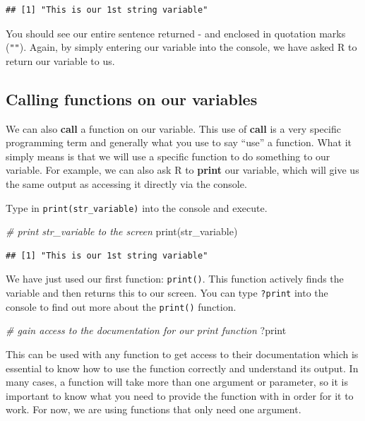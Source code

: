 \documentclass[
]{book}
\newenvironment{Shaded}{\begin{snugshade}}{\end{snugshade}}
\newcommand{\CommentTok}[1]{\textcolor[rgb]{0.56,0.35,0.01}{\textit{#1}}}
\newcommand{\FunctionTok}[1]{\textcolor[rgb]{0.00,0.00,0.00}{#1}}
\newcommand{\NormalTok}[1]{#1}
\begin{document}
\begin{verbatim}
## [1] "This is our 1st string variable"
\end{verbatim}

You should see our entire sentence returned - and enclosed in quotation marks (\texttt{""}). Again, by simply entering our variable into the console, we have asked R to return our variable to us.

\hypertarget{calling-functions-on-our-variables}{%
\subsection{Calling functions on our variables}\label{calling-functions-on-our-variables}}

We can also \textbf{call} a function on our variable. This use of \textbf{call} is a very specific programming term and generally what you use to say ``use'' a function. What it simply means is that we will use a specific function to do something to our variable. For example, we can also ask R to \textbf{print} our variable, which will give us the same output as accessing it directly via the console.

Type in \texttt{print(str\_variable)} into the console and execute.

\begin{Shaded}
\begin{Highlighting}[]
\CommentTok{\# print str\_variable to the screen}
\FunctionTok{print}\NormalTok{(str\_variable)}
\end{Highlighting}
\end{Shaded}

\begin{verbatim}
## [1] "This is our 1st string variable"
\end{verbatim}

We have just used our first function: \texttt{print()}. This function actively finds the variable and then returns this to our screen. You can type \texttt{?print} into the console to find out more about the \texttt{print()} function.

\begin{Shaded}
\begin{Highlighting}[]
\CommentTok{\# gain access to the documentation for our print function}
\NormalTok{?print}
\end{Highlighting}
\end{Shaded}

This can be used with any function to get access to their documentation which is essential to know how to use the function correctly and understand its output. In many cases, a function will take more than one argument or parameter, so it is important to know what you need to provide the function with in order for it to work. For now, we are using functions that only need one argument.
\end{document}
